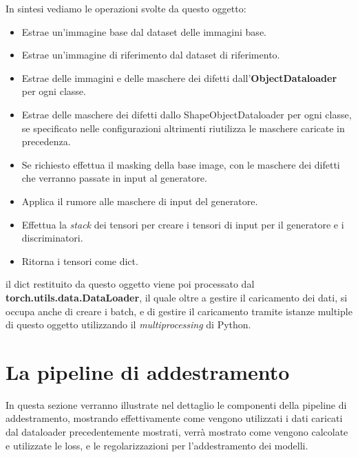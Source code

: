In sintesi vediamo le operazioni svolte da questo oggetto:

\begin{itemize}
    \item Estrae un'immagine base dal dataset delle immagini base.
    \item Estrae un'immagine di riferimento dal dataset di riferimento.
    \item Estrae delle immagini e delle maschere dei difetti dall'\textbf{ObjectDataloader} per ogni classe.
    \item Estrae delle maschere dei difetti dallo ShapeObjectDataloader per ogni classe, se specificato nelle configurazioni altrimenti riutilizza le maschere caricate in precedenza.
    \item Se richiesto effettua il masking della base image, con le maschere dei difetti che verranno passate in input al generatore.
    \item Applica il rumore alle maschere di input del generatore.
    \item Effettua la \textit{stack} dei tensori per creare i tensori di input per il generatore e i discriminatori.
    \item Ritorna i tensori come dict.
\end{itemize}

il dict restituito da questo oggetto viene poi processato dal \textbf{torch.utils.data.DataLoader}, il quale oltre a gestire il caricamento dei dati, 
si occupa anche di creare i batch, e di gestire il caricamento tramite istanze multiple di questo oggetto utilizzando il \textit{multiprocessing} di Python.

\section{La pipeline di addestramento}

In questa sezione verranno illustrate nel dettaglio le componenti della pipeline di addestramento, mostrando effettivamente come vengono utilizzati 
i dati caricati dal dataloader precedentemente mostrati, verrà mostrato come vengono calcolate e utilizzate le loss, 
e le regolarizzazioni per l'addestramento dei modelli.

